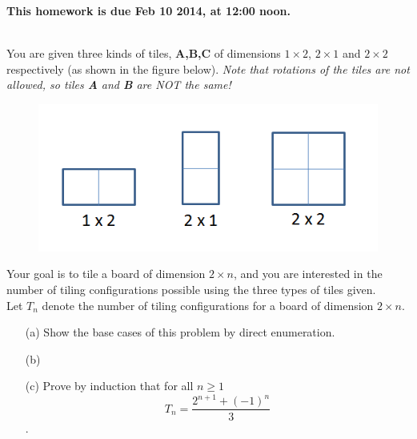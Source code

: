 \documentclass[11pt]{article}
\newif\ifsolutions
\begin{document}
\maketitle

\vspace{0.5em}
{\Large{\textbf{This homework is due Feb 10 2014, at 12:00 noon.}}}



\begin{qunlist}

 \\
You are given three kinds of tiles, \textbf{A,B,C} of dimensions $1 \times 2$, $2 \times 1$
and $2 \times 2$ respectively (as shown in the figure below).
\textit{Note that rotations of the tiles are not allowed, so tiles \textbf{A} and \textbf{B} are NOT the same!}

\begin{figure}[tile]
\centering
\includegraphics[scale=0.6]{resources/figures/tile.png}
\end{figure}

Your goal is to tile a board of dimension $2 \times n$, and you are interested in the number of
tiling configurations possible using the three types of tiles given. \\
Let $T_n$ denote the number of tiling configurations for a board of dimension $2 \times n$.
\begin{itemize}
\item[(a)] Show the base cases of this problem by direct enumeration.

\ifsolutions
\textcolor{blue}{
\textbf{Solutions:} $T_1 = 1$ as there is exactly one way to tile a $2 \times 1$ board, using tile \textbf{B}.
A $2 \times 2$ board can be tiled in exactly three different ways using the tiles \textbf{AA,BB} and \textbf{C},
so $T_2 = 3$.
}
\fi

\item[(b)] 


\item[(c)] Prove by induction that for all $n \geq 1$
\[ T_n = \frac{2^{n+1}+(-1)^n}{3} \]. 


\end{itemize}
\end{qunlist}
\end{document}
